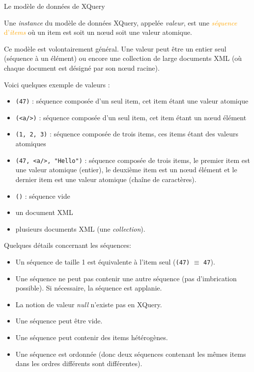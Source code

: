 \begin{frame}[allowframebreaks,t]{Le modèle de données de XQuery}

Une \textit{instance} du modèle de données XQuery, appelée \textit{valeur}, est une \textcolor{orange}{\textit{séquence} d'\textit{items}} où un item est soit un n{\oe}ud soit une valeur atomique.

\medskip

Ce modèle est volontairement général. Une valeur peut être un entier seul (séquence à un élément) ou encore une collection de large documents XML (où chaque document est désigné par son n{\oe}ud racine).

\medskip

Voici quelques exemple de valeurs :
\begin{itemize}
\item \lstinline?(47)? : séquence composée d'un seul item, cet item étant une valeur atomique
\item \lstinline?(<a/>)? : séquence composée d'un seul item, cet item étant un n{\oe}ud élément
\item \lstinline?(1, 2, 3)? : séquence composée de trois items, ces items étant des valeurs atomiques
\item \lstinline?(47, <a/>, "Hello")? : séquence composée de trois items, le premier item est une valeur atomique (entier), le deuxième item est un n{\oe}ud élément et le dernier item est une valeur atomique (chaîne de caractères).
\item \lstinline?()? : séquence vide
\item un document XML 
\item plusieurs documents XML (une \textit{collection}).
\end{itemize}

\framebreak

Quelques détails concernant les séquences:

\begin{itemize}
\item Un séquence de taille 1 est équivalente à l'item seul (\lstinline?(47)? $\equiv$ \lstinline?47?).
\item Une séquence ne peut pas contenir une autre séquence (pas d'imbrication possible). Si nécessaire, la séquence est applanie.
\item La notion de valeur \textit{null} n'existe pas en XQuery.
\item Une séquence peut être vide.
\item Une séquence peut contenir des items hétérogènes.
\item Une séquence est ordonnée (donc deux séquences contenant les mêmes items dans les ordres différents sont différentes).
\end{itemize}



\end{frame}
